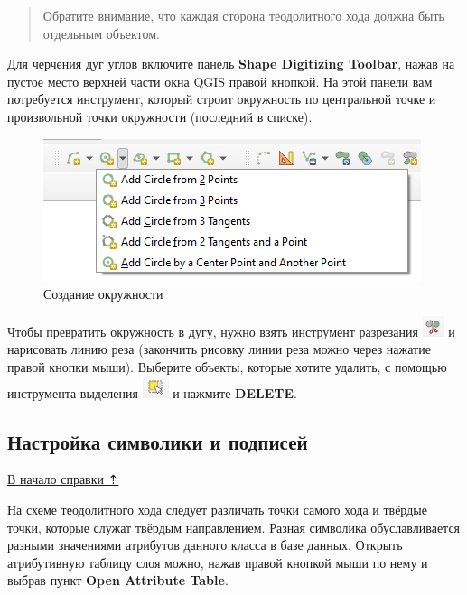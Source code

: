 \documentclass[
  12pt,
]{book}
\begin{document}
\begin{quote}
Обратите внимание, что каждая сторона теодолитного хода должна быть отдельным объектом.
\end{quote}

Для черчения дуг углов включите панель \textbf{Shape Digitizing Toolbar}, нажав на пустое место верхней части окна QGIS правой кнопкой. На этой панели вам потребуется инструмент, который строит окружность по центральной точке и произвольной точки окружности (последний в списке).

\begin{figure}
\centering
\includegraphics{images/Practice/Circle_shape.png}
\caption{Создание окружности}
\end{figure}

Чтобы превратить окружность в дугу, нужно взять инструмент разрезания \includegraphics{images/Practice/Split.png} и нарисовать линию реза (закончить рисовку линии реза можно через нажатие правой кнопки мыши). Выберите объекты, которые хотите удалить, с помощью инструмента выделения \includegraphics{images/Practice/Selection_tool.png} и нажмите \textbf{DELETE}.

\subsection{Настройка символики и подписей}\label{practice-theod-symbology}

\hyperref[practice-theod]{В начало справки ⇡}

На схеме теодолитного хода следует различать точки самого хода и твёрдые точки, которые служат твёрдым направлением. Разная символика обуславливается разными значениями атрибутов данного класса в базе данных. Открыть атрибутивную таблицу слоя можно, нажав правой кнопкой мыши по нему и выбрав пункт \textbf{Open Attribute Table}.
\end{document}
